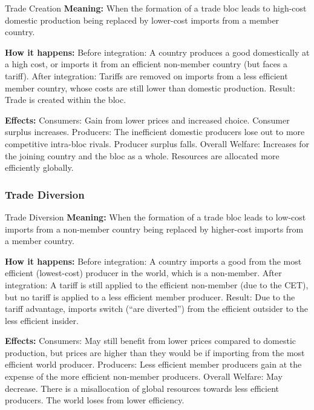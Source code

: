 \documentclass[11pt, a4paper, twoside]{book}
\begin{document}
\begin{keyterm}{Trade Creation}
\textbf{Meaning:} When the formation of a trade bloc leads to high-cost domestic production being replaced by lower-cost imports from a member country.

\textbf{How it happens:} Before integration: A country produces a good domestically at a high cost, or imports it from an efficient non-member country (but faces a tariff). After integration: Tariffs are removed on imports from a less efficient member country, whose costs are still lower than domestic production. Result: Trade is created within the bloc.

\textbf{Effects:} Consumers: Gain from lower prices and increased choice. Consumer surplus increases. Producers: The inefficient domestic producers lose out to more competitive intra-bloc rivals. Producer surplus falls. Overall Welfare: Increases for the joining country and the bloc as a whole. Resources are allocated more efficiently globally.
\end{keyterm}

\subsubsection{Trade Diversion}

\begin{keyterm}{Trade Diversion}
\textbf{Meaning:} When the formation of a trade bloc leads to low-cost imports from a non-member country being replaced by higher-cost imports from a member country.

\textbf{How it happens:} Before integration: A country imports a good from the most efficient (lowest-cost) producer in the world, which is a non-member. After integration: A tariff is still applied to the efficient non-member (due to the CET), but no tariff is applied to a less efficient member producer. Result: Due to the tariff advantage, imports switch (``are diverted'') from the efficient outsider to the less efficient insider.

\textbf{Effects:} Consumers: May still benefit from lower prices compared to domestic production, but prices are higher than they would be if importing from the most efficient world producer. Producers: Less efficient member producers gain at the expense of the more efficient non-member producers. Overall Welfare: May decrease. There is a misallocation of global resources towards less efficient producers. The world loses from lower efficiency.
\end{keyterm}
\end{document}
